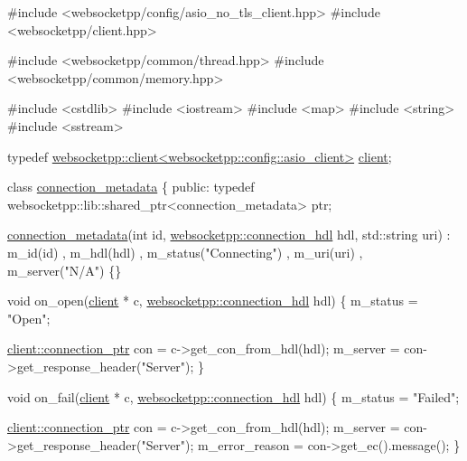 \begin{DoxyCode}
\textcolor{preprocessor}{#include <websocketpp/config/asio\_no\_tls\_client.hpp>}
\textcolor{preprocessor}{#include <websocketpp/client.hpp>}

\textcolor{preprocessor}{#include <websocketpp/common/thread.hpp>}
\textcolor{preprocessor}{#include <websocketpp/common/memory.hpp>}

\textcolor{preprocessor}{#include <cstdlib>}
\textcolor{preprocessor}{#include <iostream>}
\textcolor{preprocessor}{#include <map>}
\textcolor{preprocessor}{#include <string>}
\textcolor{preprocessor}{#include <sstream>}

\textcolor{keyword}{typedef} \mbox{\hyperlink{classwebsocketpp_1_1client}{websocketpp::client<websocketpp::config::asio\_client>}}
       \mbox{\hyperlink{classwebsocketpp_1_1client}{client}};

\textcolor{keyword}{class }\mbox{\hyperlink{classconnection__metadata}{connection\_metadata}} \{
\textcolor{keyword}{public}:
    \textcolor{keyword}{typedef} websocketpp::lib::shared\_ptr<connection\_metadata> ptr;

    \mbox{\hyperlink{classconnection__metadata}{connection\_metadata}}(\textcolor{keywordtype}{int} \textcolor{keywordtype}{id}, \mbox{\hyperlink{namespacewebsocketpp_a6b3d26a10ee7229b84b776786332631d}{websocketpp::connection\_hdl}} 
      hdl, std::string uri)
      : m\_id(id)
      , m\_hdl(hdl)
      , m\_status(\textcolor{stringliteral}{"Connecting"})
      , m\_uri(uri)
      , m\_server(\textcolor{stringliteral}{"N/A"})
    \{\}

    \textcolor{keywordtype}{void} on\_open(\mbox{\hyperlink{classwebsocketpp_1_1client}{client}} * c, \mbox{\hyperlink{namespacewebsocketpp_a6b3d26a10ee7229b84b776786332631d}{websocketpp::connection\_hdl}} hdl) \{
        m\_status = \textcolor{stringliteral}{"Open"};

        \mbox{\hyperlink{classwebsocketpp_1_1client_a2e187bbb2beac676bbfbc2e8065de83e}{client::connection\_ptr}} con = c->get\_con\_from\_hdl(hdl);
        m\_server = con->get\_response\_header(\textcolor{stringliteral}{"Server"});
    \}

    \textcolor{keywordtype}{void} on\_fail(\mbox{\hyperlink{classwebsocketpp_1_1client}{client}} * c, \mbox{\hyperlink{namespacewebsocketpp_a6b3d26a10ee7229b84b776786332631d}{websocketpp::connection\_hdl}} hdl) \{
        m\_status = \textcolor{stringliteral}{"Failed"};

        \mbox{\hyperlink{classwebsocketpp_1_1client_a2e187bbb2beac676bbfbc2e8065de83e}{client::connection\_ptr}} con = c->get\_con\_from\_hdl(hdl);
        m\_server = con->get\_response\_header(\textcolor{stringliteral}{"Server"});
        m\_error\_reason = con->get\_ec().message();
    \}


\end{DoxyCode}
